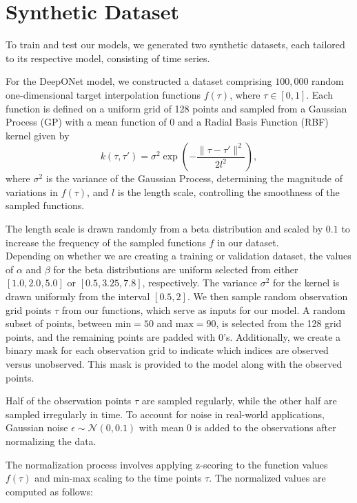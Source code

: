 \documentclass{article}
\theoremstyle{plain}
\theoremstyle{definition}
\theoremstyle{remark}
\begin{document}
\section{Synthetic Dataset}
\label{sec:dataset_arwin}
To train and test our models, we generated two synthetic datasets, each tailored to its respective model, consisting of time series.

For the DeepONet model, we constructed a dataset comprising \( 100{,}000 \) random one-dimensional target interpolation functions \( f(\tau) \), where \( \tau \in [0, 1] \). Each function is defined on a uniform grid of 128 points and sampled from a Gaussian Process (GP) with a mean function of \( 0 \) and a Radial Basis Function (RBF) kernel given by
\[
k(\tau, \tau') = \sigma^2 \exp\left(-\frac{\|\tau - \tau'\|^2}{2l^2}\right),
\]
where \( \sigma^2 \) is the variance of the Gaussian Process, determining the magnitude of variations in \( f(\tau) \), and \( l \) is the length scale, controlling the smoothness of the sampled functions.

The length scale is drawn randomly from a beta distribution and scaled by $0.1$ to increase the frequency of the sampled functions $f$ in our dataset.\\
Depending on whether we are creating a training or validation dataset, the values of \(\alpha\) and \(\beta\) for the beta distributions are uniform selected from either \([1.0, 2.0, 5.0]\) or \([0.5, 3.25, 7.8]\), respectively. The variance \(\sigma^2\) for the kernel is drawn uniformly from the interval \([0.5, 2]\).
We then sample random observation grid points \(\tau\) from our functions, which serve as inputs for our model. A random subset of points, between \(\text{min}=50\) and \(\text{max}=90\), is selected from the 128 grid points, and the remaining points are padded with \(0\)'s. Additionally, we create a binary mask for each observation grid to indicate which indices are observed versus unobserved. This mask is provided to the model along with the observed points.

Half of the observation points \(\tau\) are sampled regularly, while the other half are sampled irregularly in time. To account for noise in real-world applications, Gaussian noise \(\epsilon \sim \mathcal{N}(0, 0.1)\) with mean \(0\) is added to the observations after normalizing the data.

The normalization process involves applying z-scoring to the function values \(f(\tau)\) and min-max scaling to the time points \(\tau\). The normalized values are computed as follows:
\end{document}
